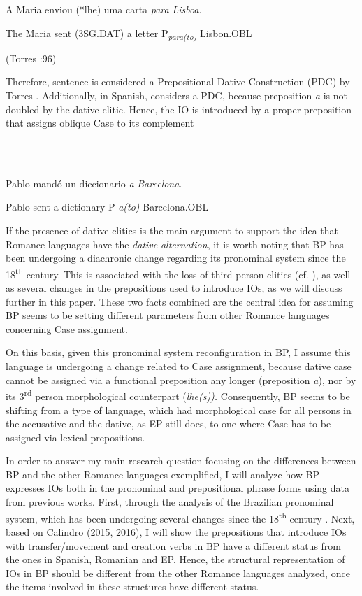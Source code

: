 \documentclass[output=paper,modfonts,nonflat]{langsci/langscibook}
\begin{document}
          A Maria     enviou (*lhe)      uma carta  \textit{para} \textit{Lisboa}.

       The Maria sent (3SG.DAT)  a letter      P\textit{\textsubscript{para(to)}} Lisbon.OBL

 (Torres \citealt{Morais2007}:96)

Therefore, sentence  is considered a Prepositional Dative Construction (PDC) by Torres \citet{Morais2007}. Additionally, in Spanish, \citet{Cuervo2003} considers  a PDC, because preposition \textit{a} is not doubled by the dative clitic. Hence, the IO is introduced by a proper preposition that assigns oblique Case to its complement

\ea%
    \label{ex:key:9}
    \gll\\
        \\
    \glt
    \z

         Pablo mandó un diccionario  \textit{a} \textit{Barcelona}.

       Pablo  sent      a dictionary     P \textit{a(to)} Barcelona.OBL

           \citep[36]{Cuervo2003}

If the presence of dative clitics is the main argument to support the idea that Romance languages have the \textit{dative} \textit{alternation}, it is worth noting that BP has been undergoing a diachronic change regarding its pronominal system since the 18\textsuperscript{th} century. This is associated with the loss of third person clitics (cf. \citealt{CarvalhoCalindro2018}), as well as several changes in the prepositions used to introduce IOs, as we will discuss further in this paper. These two facts combined are the central idea for assuming BP seems to be setting different parameters from other Romance languages concerning Case assignment.

On this basis, given this pronominal system reconfiguration in BP, I assume this language is undergoing a change related to Case assignment, because dative case cannot be assigned via a functional preposition any longer (preposition \textit{a}), nor by its 3\textsuperscript{rd} person morphological counterpart (\textit{lhe(s)).} Consequently, BP seems to be shifting from a type of language, which had morphological case for all persons in the accusative and the dative, as EP still does, to one where Case has to be assigned via lexical prepositions.

In order to answer my main research question focusing on the differences between BP and the other Romance languages exemplified, I will analyze how BP expresses IOs both in the pronominal and prepositional phrase forms using data from previous works. First, through the analysis of the Brazilian pronominal system, which has been undergoing several changes since the 18\textsuperscript{th} century \citep{KatoEtAl2009}. Next, based on Calindro (2015, 2016), I will show the prepositions that introduce IOs with transfer/movement and creation verbs in BP have a different status from the ones in Spanish, Romanian and EP. Hence, the structural representation of IOs in BP should be different from the other Romance languages analyzed, once the items involved in these structures have different status.
\end{document}
